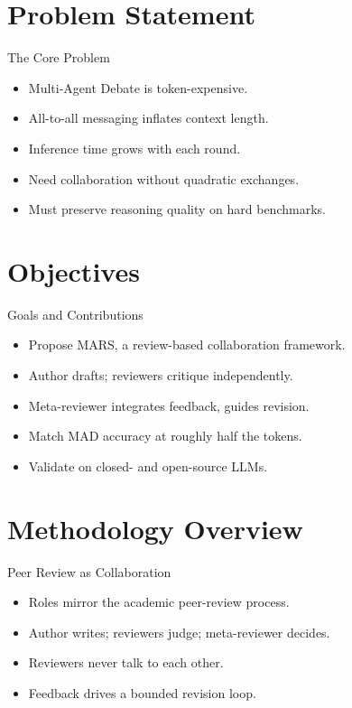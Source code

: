 \documentclass{beamer}
\begin{document}
\section{Problem Statement}
\begin{frame}{The Core Problem}
\begin{itemize}
\item Multi-Agent Debate is token-expensive.
\item All-to-all messaging inflates context length.
\item Inference time grows with each round.
\item Need collaboration without quadratic exchanges.
\item Must preserve reasoning quality on hard benchmarks.
\end{itemize}
\end{frame}

\section{Objectives}
\begin{frame}{Goals and Contributions}
\begin{itemize}
\item Propose MARS, a review-based collaboration framework.
\item Author drafts; reviewers critique independently.
\item Meta-reviewer integrates feedback, guides revision.
\item Match MAD accuracy at roughly half the tokens.
\item Validate on closed- and open-source LLMs.
\end{itemize}
\end{frame}

\section{Methodology Overview}
\begin{frame}{Peer Review as Collaboration}
\begin{itemize}
\item Roles mirror the academic peer-review process.
\item Author writes; reviewers judge; meta-reviewer decides.
\item Reviewers never talk to each other.
\item Feedback drives a bounded revision loop.
\end{itemize}
\end{frame}
\end{document}
